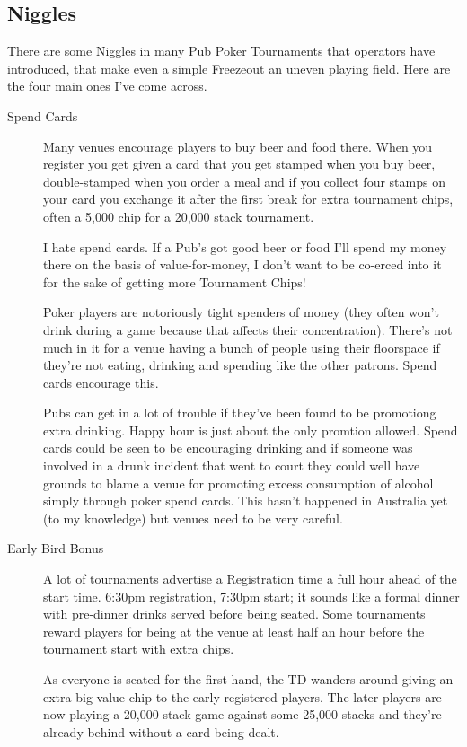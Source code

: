\subsection{Niggles}

There are some Niggles in many Pub Poker Tournaments that operators
have introduced, that make even a simple Freezeout an
uneven playing field. Here are the four main ones I've come across.


\begin{description}

\item[Spend Cards] Many venues encourage players to buy beer and food there.
When you register you get given a card that you get stamped when you
buy beer, double-stamped when you order a meal and if you collect four
stamps on your card you exchange it after the first break for extra
tournament chips, often a 5,000 chip for a 20,000 stack tournament.

I hate spend cards. If a Pub's got good beer or food
I'll spend my money there on the basis of value-for-money, I don't
want to be co-erced into it for the sake of getting more Tournament Chips!

Poker players are notoriously tight spenders of money (they often
won't drink during a game because that affects their concentration).
There's not much in it for a venue having a bunch of people using
their floorspace if they're not eating, drinking and spending like
the other patrons. Spend cards encourage this.

Pubs can get in a lot of trouble if they've been found to be
promotiong extra drinking. Happy hour is just about the only
promtion allowed. Spend cards could be seen to be encouraging drinking
and if someone was involved in a drunk incident that went
to court they could well have grounds to blame a venue for
promoting excess consumption of alcohol simply through poker
spend cards. This hasn't happened in Australia yet (to my knowledge)
but venues need to be very careful.

\item[Early Bird Bonus] A lot of tournaments advertise a Registration
time a full hour ahead of the start time. 6:30pm registration, 7:30pm
start; it sounds like a formal dinner with pre-dinner drinks served
before being seated. Some tournaments reward players for being
at the venue at least half an hour before the tournament start with extra
chips.

As everyone is seated for the first hand, the TD wanders around
giving an extra big value chip to the early-registered players. The
later players are now playing a 20,000 stack game against some
25,000 stacks and they're already behind without a card being dealt.


\end{description}
